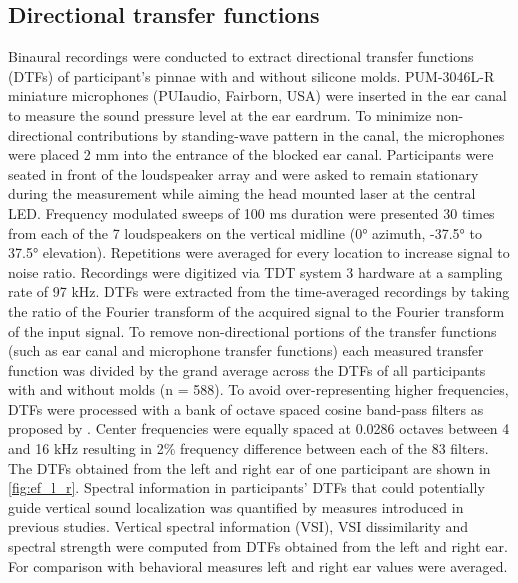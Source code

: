 \subsection{Directional transfer functions}
Binaural recordings were conducted to extract directional transfer functions (DTFs) of participant’s pinnae with and without silicone molds. PUM-3046L-R miniature microphones (PUIaudio, Fairborn, USA) were inserted in the ear canal to measure the sound pressure level at the ear eardrum. To minimize non-directional contributions by standing-wave pattern in the canal, the microphones were placed 2 mm into the entrance of the blocked ear canal. Participants were seated in front of the loudspeaker array and were asked to remain stationary during the measurement while aiming the head mounted laser at the central LED. Frequency modulated sweeps of 100 ms duration were presented 30 times from each of the 7 loudspeakers on the vertical midline (0° azimuth, -37.5° to 37.5° elevation). Repetitions were averaged for every location to increase signal to noise ratio. Recordings were digitized via TDT system 3 hardware at a sampling rate of 97 kHz. DTFs were extracted from the time-averaged recordings by taking the ratio of the Fourier transform of the acquired signal to the Fourier transform of the input signal. To remove non-directional portions of the transfer functions (such as ear canal and microphone transfer functions) each measured transfer function was divided by the grand average across the DTFs of all participants with and without molds (n = 588). To avoid over-representing higher frequencies, DTFs were processed with a bank of octave spaced cosine band-pass filters as proposed by \citet{middlebrooks_individual_1999}. Center frequencies were equally spaced at 0.0286 octaves between 4 and 16 kHz resulting in 2\% frequency difference between each of the 83 filters. The DTFs obtained from the left and right ear of one participant are shown in \cref{fig:ef_l_r}. Spectral information in participants' DTFs that could potentially guide vertical sound localization was quantified by measures introduced in previous studies. Vertical spectral information (VSI), VSI dissimilarity \citep{trapeau_fast_2016} and spectral strength \citep{andeol_sound_2013} were computed from DTFs obtained from the left and right ear. For comparison with behavioral measures left and right ear values were averaged.

